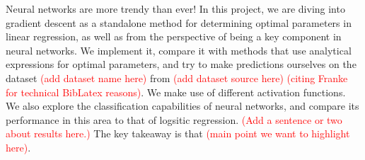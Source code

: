 \begin{adjustwidth}{2cm}{2cm} %
        Neural networks are more trendy than ever! In this project, we are diving into gradient descent as a standalone method for determining optimal parameters in linear regression, as well as from the perspective of being a key component in neural networks. We implement it, compare it with methods that use analytical expressions for optimal parameters, and try to make predictions ourselves on the dataset \textcolor{red}{(add dataset name here)} from \textcolor{red}{(add dataset source here)} \cite{franke} \textcolor{red}{(citing Franke for technical BibLatex reasons)}. We make use of different activation functions. We also explore the classification capabilities of neural networks, and compare its performance in this area to that of logsitic regression. \textcolor{red}{(Add a sentence or two about results here.)} The key takeaway is that \textcolor{red}{(main point we want to highlight here)}.
      \end{adjustwidth}

